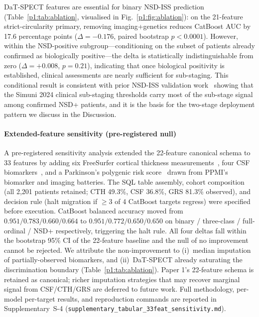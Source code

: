 \documentclass[10pt,letterpaper]{article}
\begin{document}
DaT-SPECT features are essential for binary NSD-ISS prediction (Table~\ref{p1:tab:ablation}, visualised in Fig.~\ref{p1:fig:ablation}): on the 21-feature strict-circularity primary, removing imaging+genetics reduces CatBoost AUC by 17.6 percentage points ($\Delta{=}-0.176$, paired bootstrap $p{<}0.0001$). However, within the NSD-positive subgroup---conditioning on the subset of patients already confirmed as biologically positive---the delta is statistically indistinguishable from zero ($\Delta{=}+0.008$, $p{=}0.21$), indicating that once biological positivity is established, clinical assessments are nearly sufficient for sub-staging. This conditional result is consistent with prior NSD-ISS validation work~\cite{simuni2024val,russo2025} showing that the Simuni 2024 clinical sub-staging thresholds carry most of the sub-stage signal among confirmed NSD+ patients, and it is the basis for the two-stage deployment pattern we discuss in the Discussion.

\paragraph*{Extended-feature sensitivity (pre-registered null)} A pre-registered sensitivity analysis extended the 22-feature canonical schema to 33 features by adding six FreeSurfer cortical thickness measurements~\cite{fischl2012}, four CSF biomarkers~\cite{mollenhauer2017}, and a Parkinson's polygenic risk score~\cite{nalls2019} drawn from PPMI's biomarker and imaging batteries. The SQL table assembly, cohort composition (all 2{,}201 patients retained; CTH 49.3\%, CSF 36.8\%, GRS 81.3\% observed), and decision rule (halt migration if $\geq3$ of 4 CatBoost targets regress) were specified before execution. CatBoost balanced accuracy moved from $0.951 / 0.783 / 0.660 / 0.664$ to $0.951 / 0.772 / 0.650 / 0.650$ on binary / three-class / full-ordinal / NSD+ respectively, triggering the halt rule. All four deltas fall within the bootstrap 95\% CI of the 22-feature baseline and the null of no improvement cannot be rejected. We attribute the non-improvement to (i)~median imputation of partially-observed biomarkers, and (ii)~DaT-SPECT already saturating the discrimination boundary (Table~\ref{p1:tab:ablation}). Paper 1's 22-feature schema is retained as canonical; richer imputation strategies that may recover marginal signal from CSF/CTH/GRS are deferred to future work. Full methodology, per-model per-target results, and reproduction commands are reported in Supplementary~S-4 (\texttt{supplementary\_tabular\_33feat\_sensitivity.md}).
\end{document}

